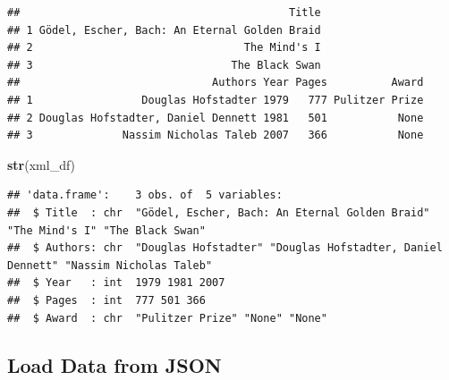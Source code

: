 \documentclass[
]{article}
\newenvironment{Shaded}{\begin{snugshade}}{\end{snugshade}}
\newcommand{\FunctionTok}[1]{\textcolor[rgb]{0.13,0.29,0.53}{\textbf{#1}}}
\newcommand{\NormalTok}[1]{#1}
\begin{document}
\begin{verbatim}
##                                          Title
## 1 Gödel, Escher, Bach: An Eternal Golden Braid
## 2                                 The Mind's I
## 3                               The Black Swan
##                              Authors Year Pages          Award
## 1                 Douglas Hofstadter 1979   777 Pulitzer Prize
## 2 Douglas Hofstadter, Daniel Dennett 1981   501           None
## 3              Nassim Nicholas Taleb 2007   366           None
\end{verbatim}

\begin{Shaded}
\begin{Highlighting}[]
\FunctionTok{str}\NormalTok{(xml\_df)}
\end{Highlighting}
\end{Shaded}

\begin{verbatim}
## 'data.frame':    3 obs. of  5 variables:
##  $ Title  : chr  "Gödel, Escher, Bach: An Eternal Golden Braid" "The Mind's I" "The Black Swan"
##  $ Authors: chr  "Douglas Hofstadter" "Douglas Hofstadter, Daniel Dennett" "Nassim Nicholas Taleb"
##  $ Year   : int  1979 1981 2007
##  $ Pages  : int  777 501 366
##  $ Award  : chr  "Pulitzer Prize" "None" "None"
\end{verbatim}

\subsection{Load Data from JSON}\label{load-data-from-json}
\end{document}
